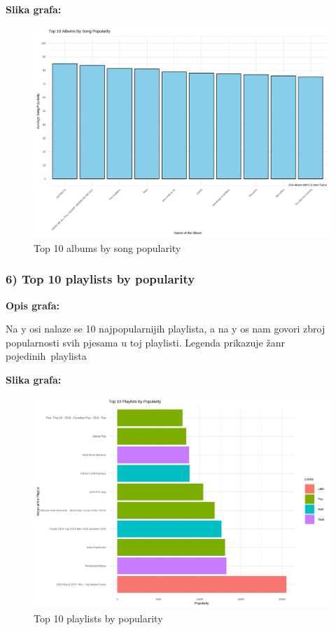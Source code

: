 	\textbf{Slika grafa:}
	\begin{figure}[H]
		\includegraphics[scale=0.9]{slike/albums_by_song_popularity.png}
		\centering
		\caption{Top 10 albums by song popularity}
		
	\end{figure}
	
	\subsubsection{6) Top 10 playlists by popularity}
	
	\textbf{Opis grafa:}
	
	Na y osi nalaze se 10 najpopularnijih playlista, a na y os nam govori zbroj popularnosti svih pjesama u toj playlisti. Legenda prikazuje žanr pojedinih playlista 
	
	\textbf{Slika grafa:}
	\begin{figure}[H]
		\includegraphics[scale=0.9]{slike/playlists_by_popularity.png}
		\centering
		\caption{Top 10 playlists by popularity}
		
	\end{figure}
	
